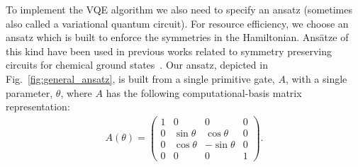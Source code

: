\documentclass[
prx,
superscriptaddress,
twocolumn,
longbibliography
]{revtex4-1}
\begin{document}
To implement the VQE algorithm we also need to specify an ansatz (sometimes also called a variational quantum circuit). For resource efficiency, we choose an ansatz which is built to enforce the symmetries in the Hamiltonian. Ans\"{a}tze of this kind have been used in previous works related to symmetry preserving circuits for chemical ground states~\cite{PhysRevA.98.022322,gard2019efficient,barron2020vqe,PhysRevB.102.075104,vandyke2021preparing}. Our ansatz, depicted in Fig.~\ref{fig:general_ansatz}, is built from a single primitive gate, $A$, with a single parameter, $\theta$, where $A$ has the following computational-basis matrix representation:
 \begin{eqnarray}
                A(\theta)=\begin{pmatrix}
                1 & 0 & 0 & 0\\
                0 & \sin \theta  & \cos \theta  & 0\\
                0 & \cos \theta & -\sin \theta & 0\\
                0 & 0 & 0 &1
            \end{pmatrix}.\label{eq:Agate}
 \end{eqnarray}
            
\end{document}
